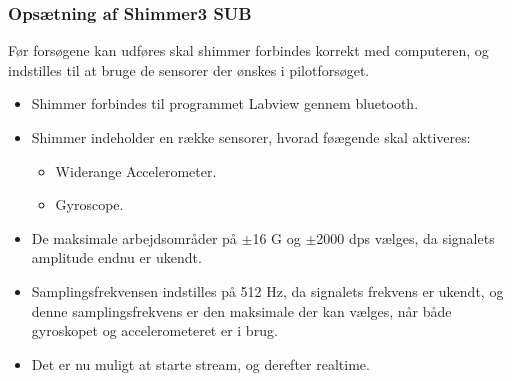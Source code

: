 \subsubsection{Opsætning af Shimmer3 SUB}
Før forsøgene kan udføres skal shimmer forbindes korrekt med computeren, og indstilles til at bruge de sensorer der ønskes i pilotforsøget. \vspace{-3mm}
\begin{itemize}
	\item Shimmer forbindes til programmet Labview gennem bluetooth.
	\item Shimmer indeholder en række sensorer, hvorad føægende skal aktiveres: 
		\begin{itemize}
			\item Widerange Accelerometer.
			\item Gyroscope.
		\end{itemize}
	\item De maksimale arbejdsområder på $\pm$16 G og $\pm$2000 dps vælges, da signalets amplitude endnu er ukendt.
	\item Samplingsfrekvensen indstilles på 512 Hz, da signalets frekvens er ukendt, og denne samplingsfrekvens er den maksimale der kan vælges, når både gyroskopet og accelerometeret er i brug.  
	\item Det er nu muligt at starte stream, og derefter realtime.
	
	 
\end{itemize}





